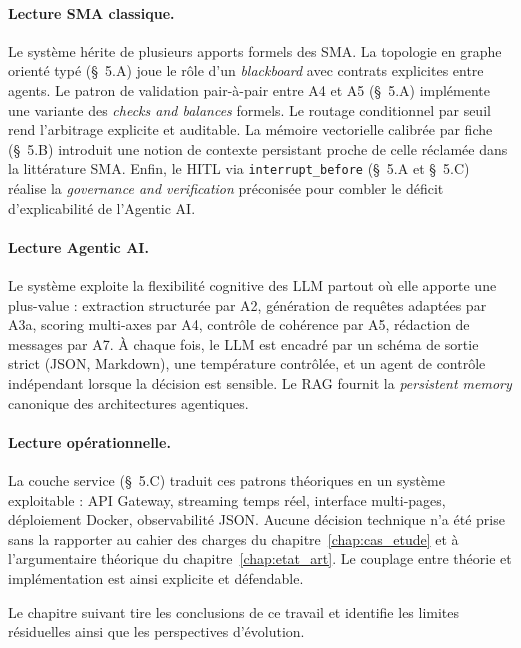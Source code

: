 \paragraph{Lecture SMA classique.} Le système hérite de plusieurs apports formels des SMA. La topologie en graphe orienté typé (\S~5.A) joue le rôle d'un \emph{blackboard} avec contrats explicites entre agents. Le patron de validation pair-à-pair entre A4 et A5 (\S~5.A) implémente une variante des \emph{checks and balances} formels. Le routage conditionnel par seuil rend l'arbitrage explicite et auditable. La mémoire vectorielle calibrée par fiche (\S~5.B) introduit une notion de contexte persistant proche de celle réclamée dans la littérature SMA. Enfin, le HITL via \texttt{interrupt\_before} (\S~5.A et \S~5.C) réalise la \emph{governance and verification} préconisée pour combler le déficit d'explicabilité de l'Agentic AI.

\paragraph{Lecture Agentic AI.} Le système exploite la flexibilité cognitive des LLM partout où elle apporte une plus-value : extraction structurée par A2, génération de requêtes adaptées par A3a, scoring multi-axes par A4, contrôle de cohérence par A5, rédaction de messages par A7. À chaque fois, le LLM est encadré par un schéma de sortie strict (JSON, Markdown), une température contrôlée, et un agent de contrôle indépendant lorsque la décision est sensible. Le RAG fournit la \emph{persistent memory} canonique des architectures agentiques.

\paragraph{Lecture opérationnelle.} La couche service (\S~5.C) traduit ces patrons théoriques en un système exploitable : API Gateway, streaming temps réel, interface multi-pages, déploiement Docker, observabilité JSON. Aucune décision technique n'a été prise sans la rapporter au cahier des charges du chapitre~\ref{chap:cas_etude} et à l'argumentaire théorique du chapitre~\ref{chap:etat_art}. Le couplage entre théorie et implémentation est ainsi explicite et défendable.

Le chapitre suivant tire les conclusions de ce travail et identifie les limites résiduelles ainsi que les perspectives d'évolution.
